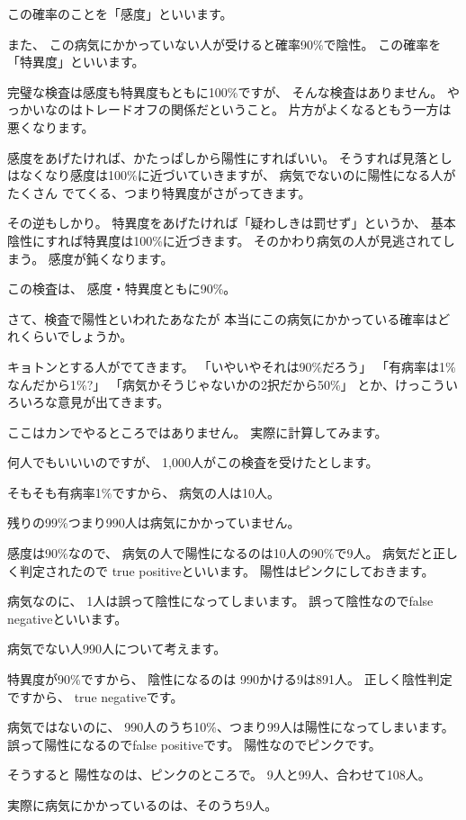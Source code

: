 \documentclass[uplatex,jis2004,dvipdfmx,14pt]{jsarticle}
\begin{document}
この確率のことを「感度」といいます。

また、
この病気にかかっていない人が受けると確率90\%で陰性。
この確率を「特異度」といいます。



完璧な検査は感度も特異度もともに100\%ですが、
そんな検査はありません。
やっかいなのはトレードオフの関係だということ。
片方がよくなるともう一方は悪くなります。

感度をあげたければ、かたっぱしから陽性にすればいい。
そうすれば見落としはなくなり感度は100\%に近づいていきますが、
病気でないのに陽性になる人がたくさん
でてくる、つまり特異度がさがってきます。

その逆もしかり。
特異度をあげたければ「疑わしきは罰せず」というか、
基本陰性にすれば特異度は100\%に近づきます。
そのかわり病気の人が見逃されてしまう。
感度が鈍くなります。


この検査は、
感度・特異度ともに90\%。


さて、検査で陽性といわれたあなたが
本当にこの病気にかかっている確率はどれくらいでしょうか。

キョトンとする人がでてきます。
「いやいやそれは90\%だろう」
「有病率は1\%なんだから1\%?」
「病気かそうじゃないかの2択だから50\%」
とか、けっこういろいろな意見が出てきます。

ここはカンでやるところではありません。
実際に計算してみます。


何人でもいいいのですが、
1,000人がこの検査を受けたとします。


そもそも有病率1\%ですから、
病気の人は10人。

残りの99\%つまり990人は病気にかかっていません。

感度は90\%なので、
病気の人で陽性になるのは10人の90\%で9人。
病気だと正しく判定されたので
true positiveといいます。
陽性はピンクにしておきます。

病気なのに、
1人は誤って陰性になってしまいます。
誤って陰性なのでfalse negativeといいます。

病気でない人990人について考えます。

特異度が90\%ですから、
陰性になるのは
990かける9は891人。
正しく陰性判定ですから、
true negativeです。

病気ではないのに、
990人のうち10\%、つまり99人は陽性になってしまいます。
誤って陽性になるのでfalse positiveです。
陽性なのでピンクです。

そうすると
陽性なのは、ピンクのところで。
9人と99人、合わせて108人。

実際に病気にかかっているのは、そのうち9人。
\end{document}
